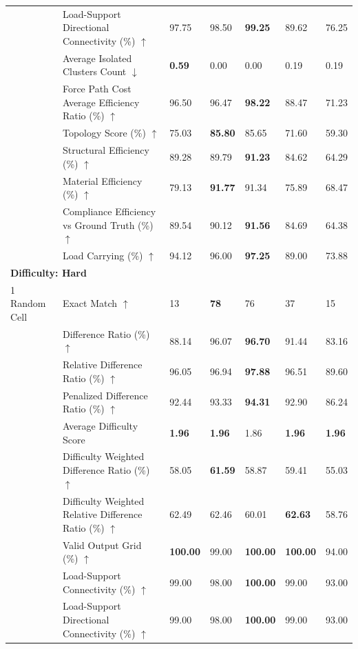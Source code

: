 \begin{table}[!h]
{\begin{tabular}{lllllll}
 & Load-Support Directional Connectivity (\%) $\uparrow$ & 97.75 & 98.50 & \textbf{99.25} & 89.62 & 76.25 \\
 & Average Isolated Clusters Count $\downarrow$ & \textbf{0.59} & 0.00 & 0.00 & 0.19 & 0.19 \\
 & Force Path Cost Average Efficiency Ratio (\%) $\uparrow$ & 96.50 & 96.47 & \textbf{98.22} & 88.47 & 71.23 \\
 & Topology Score (\%) $\uparrow$ & 75.03 & \textbf{85.80} & 85.65 & 71.60 & 59.30 \\
 & Structural Efficiency (\%) $\uparrow$ & 89.28 & 89.79 & \textbf{91.23} & 84.62 & 64.29 \\
 & Material Efficiency (\%) $\uparrow$ & 79.13 & \textbf{91.77} & 91.34 & 75.89 & 68.47 \\
 & Compliance Efficiency vs Ground Truth (\%) $\uparrow$ & 89.54 & 90.12 & \textbf{91.56} & 84.69 & 64.38 \\
 & Load Carrying (\%) $\uparrow$ & 94.12 & 96.00 & \textbf{97.25} & 89.00 & 73.88 \\
\midrule
\multicolumn{7}{l}{\textbf{Difficulty: Hard}}\\
\midrule
1 Random Cell & Exact Match $\uparrow$ & 13 & \textbf{78} & 76 & 37 & 15 \\
 & Difference Ratio (\%) $\uparrow$ & 88.14 & 96.07 & \textbf{96.70} & 91.44 & 83.16 \\
 & Relative Difference Ratio (\%) $\uparrow$ & 96.05 & 96.94 & \textbf{97.88} & 96.51 & 89.60 \\
 & Penalized Difference Ratio (\%) $\uparrow$ & 92.44 & 93.33 & \textbf{94.31} & 92.90 & 86.24 \\
 & Average Difficulty Score & \textbf{1.96} & \textbf{1.96} & 1.86 & \textbf{1.96} & \textbf{1.96} \\
 & Difficulty Weighted Difference Ratio (\%) $\uparrow$ & 58.05 & \textbf{61.59} & 58.87 & 59.41 & 55.03 \\
 & Difficulty Weighted Relative Difference Ratio (\%) $\uparrow$ & 62.49 & 62.46 & 60.01 & \textbf{62.63} & 58.76 \\
 & Valid Output Grid (\%) $\uparrow$ & \textbf{100.00} & 99.00 & \textbf{100.00} & \textbf{100.00} & 94.00 \\
 & Load-Support Connectivity (\%) $\uparrow$ & 99.00 & 98.00 & \textbf{100.00} & 99.00 & 93.00 \\
 & Load-Support Directional Connectivity (\%) $\uparrow$ & 99.00 & 98.00 & \textbf{100.00} & 99.00 & 93.00 \\

\end{tabular}}
\end{table}
